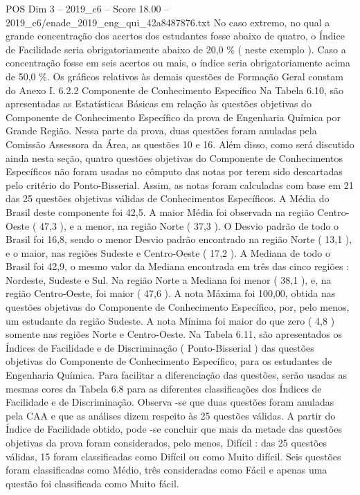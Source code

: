 \begin{textsample}{POS Dim 3 – 2019\_c6 – Score 18.00 – 2019\_c6/enade\_2019\_eng\_qui\_42a8487876.txt}
No caso extremo, no qual a grande concentração dos acertos dos estudantes fosse abaixo de quatro, o Índice de Facilidade seria obrigatoriamente abaixo de 20,0 \% ( neste exemplo ).
Caso a concentração fosse em seis acertos ou mais, o índice seria obrigatoriamente acima de 50,0 \%.
Os gráficos relativos às demais questões de Formação Geral constam do Anexo I. 6.2.2 Componente de Conhecimento Específico Na Tabela 6.10, são apresentadas as Estatísticas Básicas em relação às questões objetivas do Componente de Conhecimento Específico da prova de Engenharia Química por Grande Região.
Nessa parte da prova, duas questões foram anuladas pela Comissão Assessora da Área, as questões 10 e 16.
Além disso, como será discutido ainda nesta seção, quatro questões objetivas do Componente de Conhecimentos Específicos não foram usadas no cômputo das notas por terem sido descartadas pelo critério do Ponto-Bisserial.
Assim, as notas foram calculadas com base em 21 das 25 questões objetivas válidas de Conhecimentos Específicos.
A Média do Brasil deste componente foi 42,5.
A maior Média foi observada na região Centro-Oeste ( 47,3 ), e a menor, na região Norte ( 37,3 ).
O Desvio padrão de todo o Brasil foi 16,8, sendo o menor Desvio padrão encontrado na região Norte ( 13,1 ), e o maior, nas regiões Sudeste e Centro-Oeste ( 17,2 ).
A Mediana de todo o Brasil foi 42,9, o mesmo valor da Mediana encontrada em três das cinco regiões : Nordeste, Sudeste e Sul.
Na região Norte a Mediana foi menor ( 38,1 ), e, na região Centro-Oeste, foi maior ( 47,6 ).
A nota Máxima foi 100,00, obtida nas questões objetivas do Componente de Conhecimento Específico, por, pelo menos, um estudante da região Sudeste.
A nota Mínima foi maior do que zero ( 4,8 ) somente nas regiões Norte e Centro-Oeste.
Na Tabela 6.11, são apresentados os Índices de Facilidade e de Discriminação ( Ponto-Bisserial ) das questões objetivas do Componente de Conhecimento Específico, para os estudantes de Engenharia Química.
Para facilitar a diferenciação das questões, serão usadas as mesmas cores da Tabela 6.8 para as diferentes classificações dos Índices de Facilidade e de Discriminação.
Observa -se que duas questões foram anuladas pela CAA e que as análises dizem respeito às 25 questões válidas.
A partir do Índice de Facilidade obtido, pode -se concluir que mais da metade das questões objetivas da prova foram considerados, pelo menos, Difícil : das 25 questões válidas, 15 foram classificadas como Difícil ou como Muito difícil.
Seis questões foram classificadas como Médio, três consideradas como Fácil e apenas uma questão foi classificada como Muito fácil.

\end{textsample}
